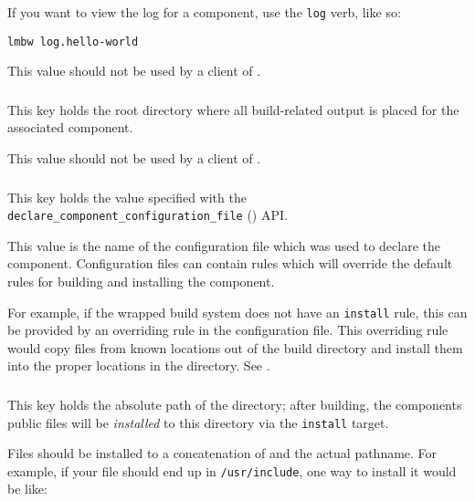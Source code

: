 If you want to view the log for a component, use the \texttt{log}
verb, like so:

\begin{verbatim}
lmbw log.hello-world
\end{verbatim}

This value should not be used by a client of \lmsbw.

\subsubsection{}

This key holds the root directory where all build-related output is
placed for the associated component.

This value should not be used by a client of \lmsbw.

\subsubsection{}

This key holds the value specified with the
\texttt{declare\_component\_configuration\_file}
() API.

This value is the name of the configuration file which was used to
declare the component.  Configuration files can contain \makefile
rules which will override the default rules for building and
installing the component.

For example, if the wrapped build system does not have an
\texttt{install} rule, this can be provided by an overriding rule in
the configuration file.  This overriding rule would copy files from
known locations out of the build directory and install them into the
proper locations in the \destdir directory.  See
.

\subsubsection{}

This key holds the absolute path of the \destdir directory; after
building, the components public files will be \emph{installed} to this
directory via the \texttt{install} target.

Files should be installed to a concatenation of \destdir and the actual
pathname.  For example, if your file should end up in
\texttt{/usr/include}, one way to install it would be like:


